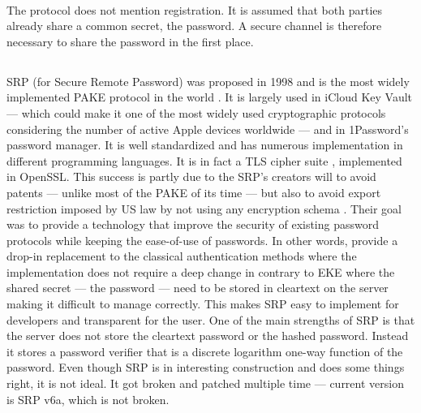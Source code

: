﻿\documentclass[../report.tex]{subfiles}
\begin{document}
\paragraph{}
The protocol does not mention registration. It is assumed that both parties already share a common secret, the password. A secure channel is therefore necessary to share the password in the first place.
\subsection{}
\paragraph{}
SRP \cite{SRP_Paper, SRP_6_Paper} (for Secure Remote Password) was proposed in 1998 and is the most widely implemented PAKE protocol in the world \cite{PAKE_Green_blog}.
It is largely used in iCloud Key Vault --- which could make it one of the most widely used cryptographic protocols \cite{PAKE_Green_blog} considering the number of active Apple devices worldwide --- and in 1Password's password manager.
It is well standardized and has numerous implementation in different programming languages. %
It is in fact a TLS cipher suite \cite{SRP_RFC_3}, implemented in OpenSSL.
This success is partly due to the SRP's creators will to avoid patents --- unlike most of the PAKE of its time --- but also to avoid export restriction imposed by US law by not using any encryption schema \cite{SRP_Formal_Analysis}.
Their goal was to provide a technology that improve the security of existing password protocols while keeping the ease-of-use of passwords. In other words, provide a drop-in replacement to the classical authentication methods where the implementation does not require a deep change in contrary to EKE where the shared secret --- the password --- need to be stored in cleartext on the server making it difficult to manage correctly.
This makes SRP easy to implement for developers and transparent for the user.
One of the main strengths of SRP is that the server does not store the cleartext password or the hashed password. Instead it stores a password verifier that is a discrete logarithm one-way function of the password.
Even though SRP is in interesting construction and does some things right, it is not ideal.
It got broken and patched multiple time --- current version is SRP v6a, which is not broken.
\end{document}

